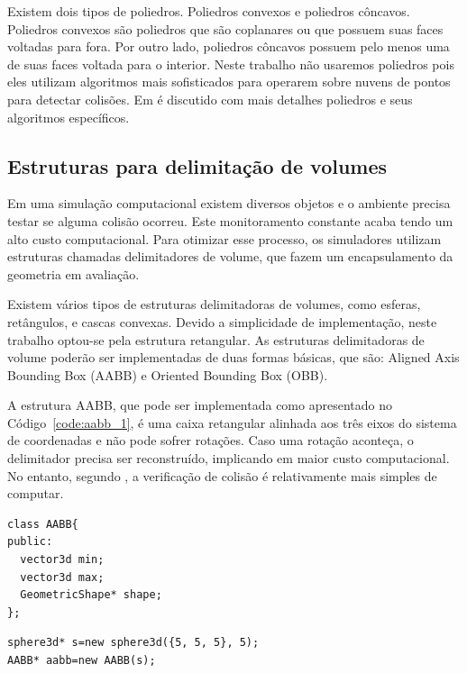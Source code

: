 Existem dois tipos de poliedros. Poliedros convexos e poliedros
côncavos. Poliedros convexos são poliedros que são coplanares ou que possuem
suas faces voltadas para fora. Por outro lado, poliedros côncavos possuem
pelo menos uma de suas faces voltada para o interior.
Neste trabalho não usaremos poliedros pois eles utilizam algoritmos mais
sofisticados para operarem sobre nuvens de pontos para detectar colisões.
Em  é discutido com mais detalhes poliedros e seus algoritmos específicos.

\subsection{ Estruturas para delimitação de volumes}

Em uma simulação computacional existem diversos objetos e o ambiente precisa testar se alguma colisão ocorreu. Este monitoramento constante acaba tendo um alto custo computacional. Para otimizar esse processo, os simuladores utilizam estruturas chamadas delimitadores de volume, que fazem um encapsulamento da geometria em avaliação.

Existem vários tipos de estruturas delimitadoras de volumes, como esferas, retângulos, e cascas convexas. Devido a simplicidade de implementação, neste trabalho optou-se pela estrutura retangular. As estruturas delimitadoras de volume poderão ser implementadas de duas formas básicas, que são: Aligned Axis Bounding Box (AABB) e Oriented Bounding Box (OBB).

A estrutura AABB, que pode ser implementada como apresentado no Código~\ref{code:aabb_1}, é uma caixa retangular alinhada aos três eixos do sistema de coordenadas e não pode sofrer rotações. Caso uma rotação aconteça, o delimitador precisa ser reconstruído, implicando em maior custo computacional. No entanto, segundo , a verificação de colisão é relativamente mais simples de computar.

\begin{lstlisting}[frame=single,caption=Exemplo de AABB\label{code:aabb_1}]
class AABB{
public:
  vector3d min;
  vector3d max;
  GeometricShape* shape;
};
\end{lstlisting}

\begin{lstlisting}[frame=single,caption=Exemplo de AABB e Esfera\label{code:aabbSphere}]
sphere3d* s=new sphere3d({5, 5, 5}, 5);
AABB* aabb=new AABB(s);
\end{lstlisting}


